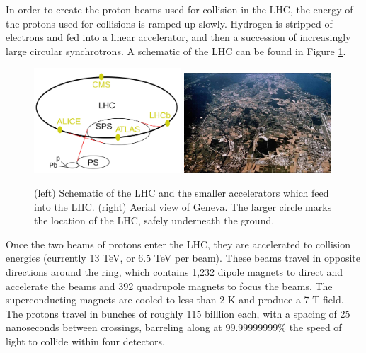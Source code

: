 In order to create the proton beams used for collision in the LHC, the energy of the protons used for collisions is ramped up slowly. Hydrogen is stripped of electrons and fed into a linear accelerator, and then a succession of increasingly large circular synchrotrons. A schematic of the LHC can be found in Figure \ref{Fig:Detect:LHC}.
\begin{figure}[h!]
    \centering
        \includegraphics[width=0.49\textwidth]{F3/LHC}
        \includegraphics[width=0.49\textwidth]{F3/LHC2}
        \caption{(left) Schematic of the LHC and the smaller accelerators which feed into the LHC. (right) Aerial view of Geneva. The larger circle marks the location of the LHC, safely underneath the ground.}
        \label{Fig:Detect:LHC}
\end{figure}
Once the two beams of protons enter the LHC, they are accelerated to collision energies (currently 13 TeV, or 6.5 TeV per beam). These beams travel in opposite directions around the ring, which contains 1,232 dipole magnets to direct and accelerate the beams and 392 quadrupole magnets to focus the beams. The superconducting magnets are cooled to less than 2 K and produce a 7 T field. The protons travel in bunches of roughly 115 billlion each, with a spacing of 25 nanoseconds between crossings, barreling along at 99.99999999$\%$ the speed of light to collide within four detectors.

